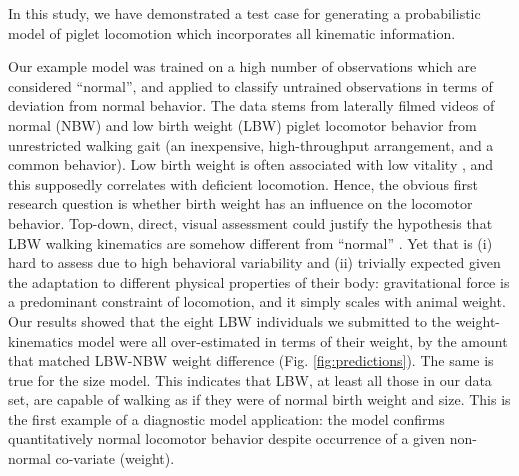 \bigskip
In this study, we have demonstrated a test case for generating a probabilistic model of piglet locomotion which incorporates all kinematic information.

Our example model was trained on a high number of observations which are considered ``normal'', and applied to classify untrained observations in terms of deviation from normal behavior.
The data stems from laterally filmed videos of normal (NBW) and low birth weight (LBW) piglet locomotor behavior from unrestricted walking gait (an inexpensive, high-throughput arrangement, and a common behavior).
Low birth weight is often associated with low vitality \citep{Baxter2008,Hales2013,Muns2013}, and this supposedly correlates with deficient locomotion.
Hence, the obvious first research question is whether birth weight has an influence on the locomotor behavior.
Top-down, direct, visual assessment could justify the hypothesis that LBW walking kinematics are somehow different from ``normal'' \citep{DEath2012}.
Yet that is (i) hard to assess due to high behavioral variability and (ii) trivially expected given the adaptation to different physical properties of their body: gravitational force is a predominant constraint of locomotion, and it simply scales with animal weight.
Our results showed that the eight LBW individuals we submitted to the weight-kinematics model were all over-estimated in terms of their weight, by the amount that matched LBW-NBW weight difference (Fig. \ref{fig:predictions}).
The same is true for the size model.
This indicates that LBW, at least all those in our data set, are capable of walking as if they were of normal birth weight and size.
This is the first example of a diagnostic model application: the model confirms quantitatively normal locomotor behavior despite occurrence of a given non-normal co-variate (weight).

